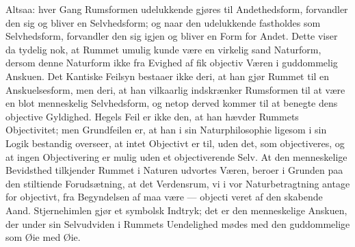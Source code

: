 \documentclass[12pt,a4paper]{book}
\begin{document}
Altsaa: hver Gang Rumsformen udelukkende gjøres til Andethedsform,
forvandler den sig og bliver en Selvhedsform; og naar den udelukkende
fastholdes som Selvhedsform, forvandler den sig igjen og bliver en Form
for Andet. Dette viser da tydelig nok, at Rummet umulig kunde være en
virkelig sand Naturform, dersom denne Naturform ikke fra Evighed af fik
objectiv Væren i guddommelig Anskuen. Det Kantiske Feilsyn bestaaer
ikke deri, at han gjør Rummet til en Anskuelsesform, men deri, at han
vilkaarlig indskrænker Rumsformen til at være en blot menneskelig
Selvhedsform, og netop derved kommer til at benegte dens objective
Gyldighed. Hegels Feil er ikke den, at han hævder Rummets
Objectivitet; men Grundfeilen er, at han i sin Naturphilosophie ligesom
i sin Logik bestandig overseer, at intet Objectivt er til, uden det,
som objectiveres, og at ingen Objectivering er mulig uden et
objectiverende Selv. At den menneskelige Bevidsthed tilkjender Rummet
i Naturen udvortes Væren, beroer i Grunden paa den stiltiende
Forudsætning, at det Verdensrum, vi i vor Naturbetragtning antage for
objectivt, fra Begyndelsen af maa være --- objecti\-%
veret af den skabende Aand. Stjernehimlen gjør et symbolsk Indtryk;
det er den menneskelige Anskuen, der under sin Selvudviden i Rummets
Uendelighed mødes med den guddommelige som Øie med Øie.
\end{document}
